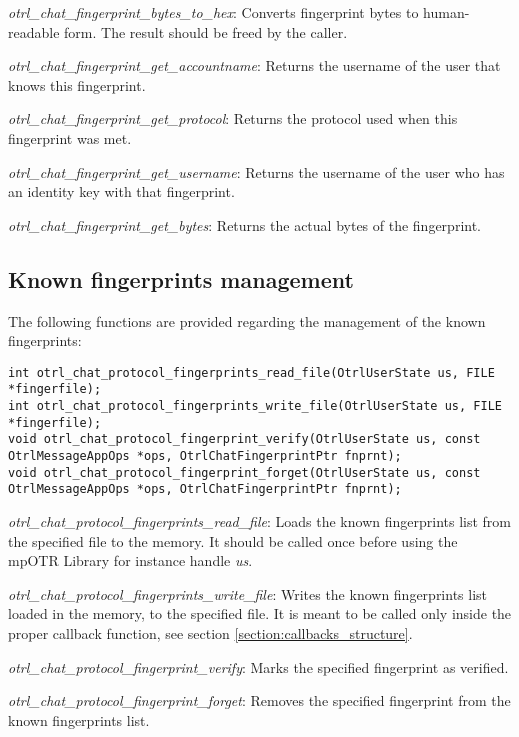 \begin{description}
  \item \emph{otrl\_chat\_fingerprint\_bytes\_to\_hex}: Converts fingerprint bytes to human-readable form. The result should be freed by the caller.
  
  \item \emph{otrl\_chat\_fingerprint\_get\_accountname}: Returns the username of the user that knows this fingerprint.
  
  \item \emph{otrl\_chat\_fingerprint\_get\_protocol}: Returns the protocol used when this fingerprint was met.
  
  \item \emph{otrl\_chat\_fingerprint\_get\_username}: Returns the username of the user who has an identity key with that fingerprint.
  
  \item \emph{otrl\_chat\_fingerprint\_get\_bytes}: Returns the actual bytes of the fingerprint.

\end{description}

\subsection{Known fingerprints management}
\label{section:fingerprint_management}
The following functions are provided regarding the management of the known fingerprints:
\begin{lstlisting}[caption={Known fingerprints management functions}]
int otrl_chat_protocol_fingerprints_read_file(OtrlUserState us, FILE *fingerfile);
int otrl_chat_protocol_fingerprints_write_file(OtrlUserState us, FILE *fingerfile);
void otrl_chat_protocol_fingerprint_verify(OtrlUserState us, const OtrlMessageAppOps *ops, OtrlChatFingerprintPtr fnprnt);
void otrl_chat_protocol_fingerprint_forget(OtrlUserState us, const OtrlMessageAppOps *ops, OtrlChatFingerprintPtr fnprnt);
\end{lstlisting}

\begin{description}
  \item \emph{otrl\_chat\_protocol\_fingerprints\_read\_file}: Loads the known fingerprints list from the specified file to the memory. It should be called once before using the mpOTR Library for instance handle \emph{us}.
  
  \item \emph{otrl\_chat\_protocol\_fingerprints\_write\_file}: Writes the known fingerprints list loaded in the memory, to the specified file. It is meant to be called only inside the proper callback function, see section \ref{section:callbacks_structure}.
  
  \item \emph{otrl\_chat\_protocol\_fingerprint\_verify}: Marks the specified fingerprint as verified.
  
  \item \emph{otrl\_chat\_protocol\_fingerprint\_forget}: Removes the specified fingerprint from the known fingerprints list.

\end{description}

